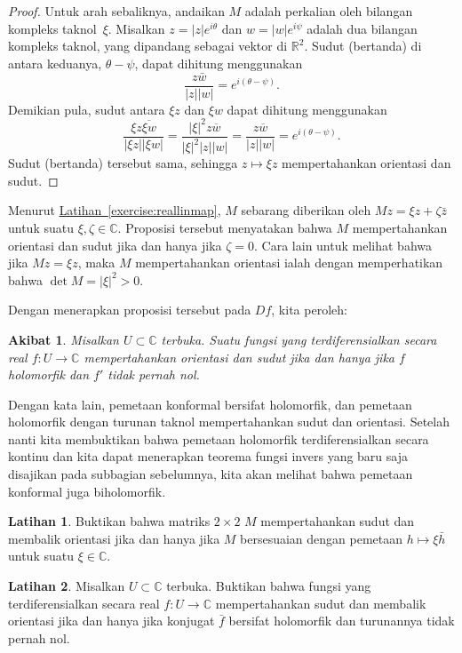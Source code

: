 \documentclass[12pt,openany]{book}
\newcommand{\sabs}[1]{\lvert {#1} \rvert}
\newcommand{\C}{{\mathbb{C}}}
\newcommand{\R}{{\mathbb{R}}}
\theoremstyle{plain}
\newtheorem{cor}[thm]{Akibat}
\theoremstyle{remark}
\theoremstyle{definition}
\newenvironment{exbox}{%
    \def\FrameCommand{\vrule width 1pt \relax\hspace{10pt}}%
    \MakeFramed{\advance\hsize-\width\FrameRestore}%
}{%
    \endMakeFramed
}
\theoremstyle{exercise}
\newtheorem{exercise}{Latihan}[section]
\theoremstyle{example}
\newcommand{\exerciseref}[1]{\hyperref[#1]{Latihan~\ref*{#1}}}
\begin{document}
\begin{proof}
Untuk arah sebaliknya, andaikan $M$ adalah perkalian oleh
bilangan kompleks taknol~$\xi$.
Misalkan
$z = \sabs{z} e^{i\theta}$ dan $w = \sabs{w} e^{i\psi}$ adalah dua bilangan
kompleks taknol, yang dipandang sebagai vektor di $\R^2$.
Sudut (bertanda) di antara keduanya, $\theta-\psi$, dapat
dihitung menggunakan
\begin{equation*}
\frac{z\bar{w}}{\sabs{z}\sabs{w}}
=
e^{i(\theta-\psi)} .
\end{equation*}
Demikian pula, sudut antara
$\xi z$ dan $\xi w$ dapat dihitung menggunakan
\begin{equation*}
\frac{\xi z\overline{\xi w}}{\sabs{\xi z}\sabs{\xi w}} 
=
\frac{\sabs{\xi}^2 z\overline{w}}{\sabs{\xi}^2 \sabs{z}\sabs{w}} 
=
\frac{z\overline{w}}{\sabs{z}\sabs{w}} = e^{i(\theta-\psi)}.
\end{equation*}
Sudut (bertanda) tersebut sama, sehingga $z \mapsto \xi z$ mempertahankan
orientasi dan sudut.
\end{proof}

Menurut \exerciseref{exercise:reallinmap},
$M$ sebarang diberikan oleh
$Mz = \xi z + \zeta \bar{z}$ untuk suatu $\xi,\zeta \in \C$.
Proposisi tersebut menyatakan bahwa $M$ mempertahankan orientasi dan sudut jika dan hanya
jika $\zeta=0$.
Cara lain untuk melihat bahwa jika $Mz = \xi z$, maka
$M$ mempertahankan orientasi ialah dengan memperhatikan bahwa
$\det M = \sabs{\xi}^2 > 0$.

Dengan menerapkan proposisi tersebut pada $Df$, kita peroleh:

\begin{cor}
Misalkan $U \subset \C$ terbuka.
Suatu fungsi yang terdiferensialkan secara real $f \colon U \to \C$
mempertahankan orientasi dan sudut
jika dan hanya jika $f$ holomorfik dan $f'$ tidak pernah nol.
\end{cor}

Dengan kata lain, pemetaan konformal bersifat holomorfik, dan pemetaan holomorfik
dengan turunan taknol mempertahankan sudut dan orientasi.
Setelah nanti kita membuktikan bahwa
pemetaan holomorfik terdiferensialkan secara kontinu dan kita dapat
menerapkan teorema fungsi invers yang baru saja disajikan pada
subbagian sebelumnya, kita akan melihat bahwa pemetaan konformal juga biholomorfik.

\begin{exbox}
\begin{exercise}
Buktikan bahwa matriks $2 \times 2$ $M$ mempertahankan sudut dan membalik
orientasi jika dan hanya jika $M$ bersesuaian dengan pemetaan $h \mapsto \xi
\bar{h}$ untuk suatu $\xi \in \C$.
\end{exercise}

\begin{exercise}
Misalkan $U \subset \C$ terbuka.
Buktikan bahwa fungsi yang terdiferensialkan secara real $f \colon U \to \C$ mempertahankan sudut
dan membalik orientasi jika dan hanya jika konjugat $\bar{f}$ bersifat
holomorfik dan turunannya tidak pernah nol.
\end{exercise}
\end{exbox}
\end{document}
